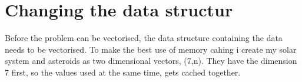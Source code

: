 \documentclass{Article}
\begin{document}

\clearpage\maketitle
\thispagestyle{empty}


\section{Changing the data structur}
Before the problem can be vectorised, the data structure containing the data needs to be vectorised. 
To make the best use of memory cahing i create my solar system and asteroids as two dimensional vectors, (7,n).
They have the dimension 7 first, so the values used at the same time, gets cached together.
\end{document}
